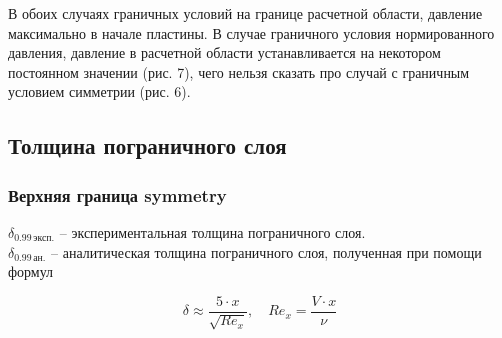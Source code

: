 \documentclass{article}
\begin{document}
В обоих случаях граничных условий на границе расчетной области, давление максимально в начале пластины. В случае граничного условия нормированного давления, давление в расчетной области устанавливается на некотором постоянном значении (рис. 7), чего нельзя сказать про случай с граничным условием симметрии (рис. 6).

\subsection{Толщина пограничного слоя}
\subsubsection{Верхняя граница symmetry}

$\delta_{0.99\,\text{эксп.}}$ -- экспериментальная толщина пограничного слоя.\\
$\delta_{0.99\,\text{ан.}}$ -- аналитическая толщина пограничного слоя, полученная при помощи формул

\begin{equation}
\delta \approx \frac{5 \cdot x}{\sqrt{Re_x}},
\quad
Re_x =\frac{ V \cdot x}{\nu}
\end{equation}
\end{document}
